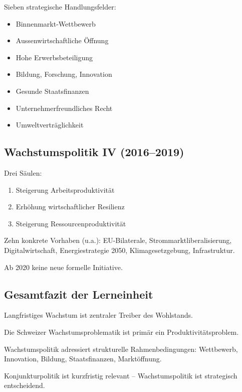 Sieben strategische Handlungsfelder:

\begin{itemize}
    \item Binnenmarkt-Wettbewerb
    \item Aussenwirtschaftliche Öffnung
    \item Hohe Erwerbsbeteiligung
    \item Bildung, Forschung, Innovation
    \item Gesunde Staatsfinanzen
    \item Unternehmerfreundliches Recht
    \item Umweltverträglichkeit
\end{itemize}

\subsection{Wachstumspolitik IV (2016–2019)}

Drei Säulen:

\begin{enumerate}
    \item Steigerung Arbeitsproduktivität
    \item Erhöhung wirtschaftlicher Resilienz
    \item Steigerung Ressourcenproduktivität
\end{enumerate}

Zehn konkrete Vorhaben (u.a.):
EU-Bilaterale, Strommarktliberalisierung, Digitalwirtschaft, Energiestrategie 2050, Klimagesetzgebung, Infrastruktur.

Ab 2020 keine neue formelle Initiative.

\subsection{Gesamtfazit der Lerneinheit}

Langfristiges Wachstum ist zentraler Treiber des Wohlstands.

Die Schweizer Wachstumsproblematik ist primär ein Produktivitätsproblem.

Wachstumspolitik adressiert strukturelle Rahmenbedingungen:
Wettbewerb, Innovation, Bildung, Staatsfinanzen, Marktöffnung.

Konjunkturpolitik ist kurzfristig relevant –
Wachstumspolitik ist strategisch entscheidend.

